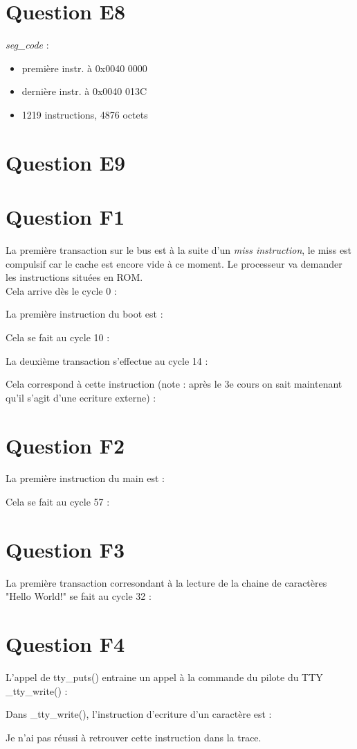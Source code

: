 \documentclass[10pt]{article}
\begin{document}
\section{Question E8}
{\it seg\_code} :
\begin{itemize}
  \item première instr. à 0x0040 0000
  \item dernière instr. à 0x0040 013C
  \item 1219 instructions, 4876 octets
\end{itemize}

\newpage{}
\section{Question E9}

\newpage{}

\section{Question F1}
La première transaction sur le bus est à la suite d'un {\it miss instruction},
le miss est compulsif car le cache est encore vide à ce moment. Le processeur va
demander les instructions situées en ROM.\\
Cela arrive dès le cycle 0 :

La première instruction du boot est :

Cela se fait au cycle 10 :

\newpage
La deuxième transaction s'effectue au cycle 14 :

Cela correspond à cette instruction (note : après le 3e cours on sait maintenant
qu'il s'agit d'une ecriture externe) :


\newpage

\section{Question F2}
La première instruction du main est :

Cela se fait au cycle 57 :


\section{Question F3}
La première transaction corresondant à la lecture de la chaine de caractères "Hello
World!" se fait au cycle 32 :

\newpage
\section{Question F4}
L'appel de tty\_puts() entraine un appel à la commande du pilote du TTY \_tty\_write() :

Dans \_tty\_write(), l'instruction d'ecriture d'un caractère est :

Je n'ai pas réussi à retrouver cette instruction dans la trace.
\end{document}
